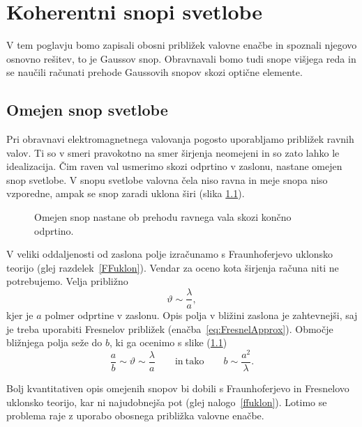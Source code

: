
\chapter{Koherentni snopi svetlobe}
V tem poglavju bomo zapisali obosni približek valovne enačbe in spoznali 
njegovo osnovno rešitev, to je Gaussov snop. Obravnavali bomo tudi snope višjega reda in
se naučili računati prehode Gaussovih snopov skozi optične elemente. 

\section{Omejen snop svetlobe}
Pri obravnavi elektromagnetnega valovanja pogosto uporabljamo
približek ravnih valov. Ti so v smeri pravokotno na smer širjenja
neomejeni in so zato lahko le idealizacija. Čim raven val usmerimo skozi odprtino
v zaslonu, nastane omejen snop svetlobe. V snopu svetlobe valovna čela niso
ravna in meje snopa niso vzporedne, ampak se snop zaradi uklona širi 
(slika \ref{fig:Uklon-na-rezi}).
\begin{figure}[h]
\centering
\def\svgwidth{120truemm} 

\caption{Omejen snop nastane ob prehodu ravnega vala skozi končno odprtino.}
\label{fig:Uklon-na-rezi}
\end{figure}

V veliki oddaljenosti od zaslona polje izračunamo s
Fraunhoferjevo uklonsko teorijo (glej razdelek~\ref{FFuklon}). 
Vendar za oceno kota širjenja računa niti ne potrebujemo. Velja približno 
\begin{equation}
\vartheta\sim\frac{\lambda}{a},
\label{eq:kot_ocena}
\end{equation}
kjer je $a$ polmer odprtine v zaslonu.
Opis polja v bližini zaslona je zahtevnejši, saj je treba uporabiti 
Fresnelov približek (enačba~\ref{eq:FresnelApprox}).
Območje bližnjega polja seže do $b$, ki ga ocenimo s slike (\ref{fig:Uklon-na-rezi})
\begin{equation}
\frac{a}{b}\sim{\vartheta}\sim \frac{\lambda}{a} \qquad \mathrm{in~tako} \qquad b\sim\frac{a^2}{\lambda}.
\label{eq:z_ocena}
\end{equation}

Bolj kvantitativen opis omejenih
snopov bi dobili s Fraunhoferjevo in Fresnelovo uklonsko teorijo,
kar ni najudobnejša pot (glej nalogo~\ref{ffuklon}). Lotimo se problema raje z 
uporabo obosnega približka valovne enačbe.

